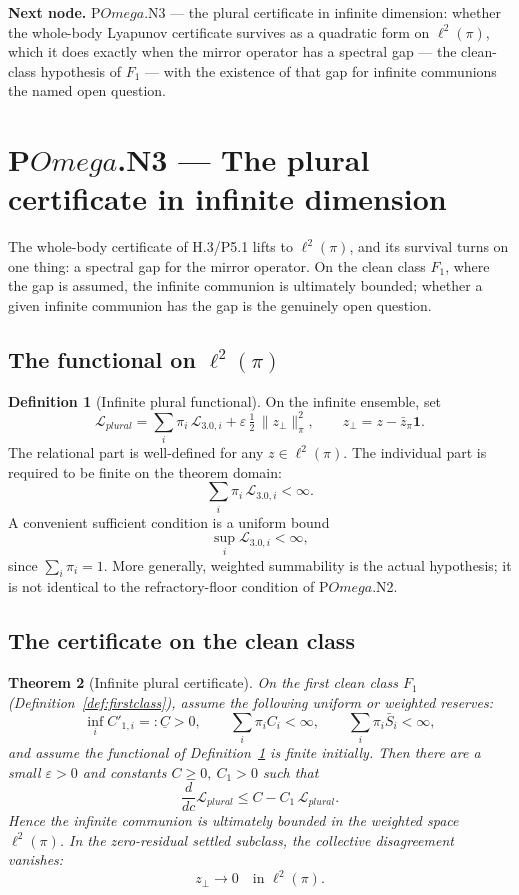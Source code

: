 \documentclass[11pt,a4paper]{article}
\def\Omega{Omega}%
\def\mathfrak#1{#1}%
\def\mathrm#1{#1}%
\def\emph#1{#1}%
\theoremstyle{definition}
\newtheorem{definition}{Definition}[section]
\theoremstyle{plain}
\newtheorem{theorem}[definition]{Theorem}
\theoremstyle{remark}
\begin{document}
\medskip
\textbf{Next node.} P$\Omega$.N3 --- the plural certificate in infinite dimension: whether the
whole-body Lyapunov certificate survives as a quadratic form on \(\ell^2(\pi)\), which it does
exactly when the mirror operator has a spectral gap --- the clean-class hypothesis of
\(\mathfrak F_1\) --- with the existence of that gap for infinite communions the named open
question.

\section{P$\Omega$.N3 --- The plural certificate in infinite dimension}

The whole-body certificate of H.3/P5.1 lifts to \(\ell^2(\pi)\), and its survival turns on one
thing: a spectral gap for the mirror operator. On the clean class \(\mathfrak F_1\), where the
gap is assumed, the infinite communion is ultimately bounded; whether a given infinite communion
\emph{has} the gap is the genuinely open question.

\subsection{The functional on \(\ell^2(\pi)\)}

\begin{definition}[Infinite plural functional]\label{def:infplural}
On the infinite ensemble, set
\[
\mathcal L_{\mathrm{plural}}
=
\sum_{i}\pi_i\,\mathcal L_{3.0,i}
+
\varepsilon\,\tfrac12\,\lVert z_\perp\rVert_\pi^2,
\qquad
z_\perp=z-\bar z_\pi\mathbf 1 .
\]
The relational part is well-defined for any \(z\in\ell^2(\pi)\). The individual
part is required to be finite on the theorem domain:
\[
\sum_i\pi_i\,\mathcal L_{3.0,i}<\infty.
\]
A convenient sufficient condition is a uniform bound
\[
\sup_i\mathcal L_{3.0,i}<\infty,
\]
since \(\sum_i\pi_i=1\). More generally, weighted summability is the actual
hypothesis; it is not identical to the refractory-floor condition of
P\(\Omega\).N2.
\end{definition}

\subsection{The certificate on the clean class}

\begin{theorem}[Infinite plural certificate]\label{thm:infcertificate}
On the first clean class \(\mathfrak F_1\) (Definition~\ref{def:firstclass}), assume
the following uniform or weighted reserves:
\[
\inf_i C'_{1,i}=:\underline C>0,
\qquad
\sum_i\pi_i C_i<\infty,
\qquad
\sum_i\pi_i\bar S_i<\infty,
\]
and assume the functional of Definition~\ref{def:infplural} is finite initially.
Then there are a small \(\varepsilon>0\) and constants \(C\ge0,\ C_1>0\) such that
\[
\frac{d}{d\mathfrak c}\mathcal L_{\mathrm{plural}}
\le
C-C_1\,\mathcal L_{\mathrm{plural}} .
\]
Hence the infinite communion is ultimately bounded in the weighted space
\(\ell^2(\pi)\). In the zero-residual settled subclass, the collective disagreement
vanishes:
\[
z_\perp\to0
\quad\text{in }\ell^2(\pi).
\]
\end{theorem}
\end{document}
